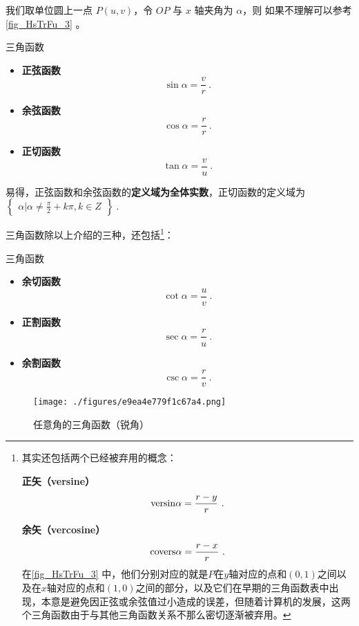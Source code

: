 我们取单位圆上一点 $P(u,v)$，令 $OP$ 与 $x$ 轴夹角为 $\alpha$，则
如果不理解可以参考\autoref{fig_HsTrFu_3} 。
\begin{definition}{三角函数}
\begin{itemize}
\item \textbf{正弦函数}
\begin{equation}
\displaystyle\sin \alpha = \frac{v}{r}~.
\end{equation}
\item \textbf{余弦函数}
\begin{equation}
\displaystyle\cos \alpha = \frac{r}{r}~.
\end{equation}
\item \textbf{正切函数}
\begin{equation}
\displaystyle\tan \alpha = \frac{v}{u}~.
\end{equation}
\end{itemize}
\end{definition}

易得，正弦函数和余弦函数的\textbf{定义域为全体实数}，正切函数的定义域为 $\begin{Bmatrix}\alpha|\alpha \neq \frac{\pi}{2}+k\pi,k\in Z\end{Bmatrix}~.$

三角函数除以上介绍的三种，还包括\footnote{其实还包括两个已经被弃用的概念：

\textbf{正矢（versine）}\begin{equation}
\mathrm{versin }\alpha=\displaystyle{r-y\over r}~.
\end{equation}

\textbf{余矢（vercosine）}
\begin{equation}
\mathrm{covers }\alpha=\displaystyle{r-x\over r}~.
\end{equation}
在\autoref{fig_HsTrFu_3} 中，他们分别对应的就是$P$在$y$轴对应的点和$(0,1)$之间以及在$x$轴对应的点和$(1,0)$之间的部分，以及它们在早期的三角函数表中出现，本意是避免因正弦或余弦值过小造成的误差，但随着计算机的发展，这两个三角函数由于与其他三角函数关系不那么密切逐渐被弃用。}：
\begin{definition}{三角函数}
\begin{itemize}
\item \textbf{余切函数}
\begin{equation}
\displaystyle\cot \alpha = \frac{u}{v}~.
\end{equation}
\item \textbf{正割函数}
\begin{equation}
\displaystyle\sec \alpha = \frac{r}{u}~.
\end{equation}
\item \textbf{余割函数}
\begin{equation}
\displaystyle\csc \alpha = \frac{r}{v}~.
\end{equation}
\end{itemize}
\end{definition}
\begin{figure}[ht]
\centering
\texttt{[image: ./figures/e9ea4e779f1c67a4.png]}
\caption{任意角的三角函数（锐角）} \label{fig_HsTrFu_3}
\end{figure}


